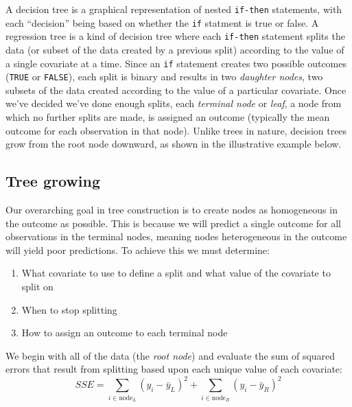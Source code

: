 \documentclass[12pt]{article}
\begin{document}
A decision tree is a graphical representation of nested \texttt{if-then} statements, with each ``decision'' being based on whether the \texttt{if} statment is true or false. A regression tree is a kind of decision tree where each \texttt{if-then} statement splits the data (or subset of the data created by a previous split) according to the value of a single covariate at a time. Since an \texttt{if} statement creates two possible outcomes (\texttt{TRUE} or \texttt{FALSE}), each split is binary and results in two \emph{daughter nodes}, two subsets of the data created according to the value of a particular covariate. Once we've decided we've done enough splits, each \emph{terminal node} or \emph{leaf}, a node from which no further splits are made, is assigned an outcome (typically the mean outcome for each observation in that node). Unlike trees in nature, decision trees grow from the root node downward, as shown in the illustrative example below.


\subsection{Tree growing} %
\label{sub:tree_growing}

Our overarching goal in tree construction is to create nodes as homogeneous in the outcome as possible. This is because we will predict a single outcome for all observations in the terminal nodes, meaning nodes heterogeneous in the outcome will yield poor predictions. To achieve this we must determine:

\begin{enumerate}
  \item What covariate to use to define a split and what value of the covariate to split on
  \item When to stop splitting
  \item How to assign an outcome to each terminal node
\end{enumerate}

We begin with all of the data (the \emph{root node}) and evaluate the sum of squared errors that result from splitting based upon each unique value of each covariate:
\begin{equation}
  SSE = \sum_{i \in \text{node}_{L}} (y_{i} - \bar{y}_{L})^2 + \sum_{i \in \text{node}_{R}} (y_{i} - \bar{y}_{R})^2 
\end{equation}
\end{document}
